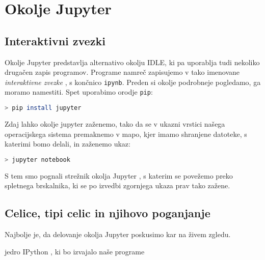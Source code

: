 \chapter{Okolje Jupyter}

\section{Interaktivni zvezki}
Okolje Jupyter predstavlja alternativo okolju IDLE, ki pa uporablja tudi nekoliko drugačen zapis programov. Programe namreč zapisujemo v tako imenovane \emph{interaktivne zvezke} , s končnico \texttt{ipynb}. Preden si okolje podrobneje pogledamo, ga moramo namestiti. Spet uporabimo orodje \texttt{pip}:
\begin{lstlisting}[language=bash]
> pip install jupyter
\end{lstlisting}
Zdaj lahko okolje jupyter zaženemo, tako da se v ukazni vrstici našega operacijskega sistema premaknemo v mapo, kjer imamo shranjene datoteke, s katerimi bomo delali, in zaženemo ukaz:
\begin{lstlisting}[language=bash]
> jupyter notebook
\end{lstlisting}
S tem smo pognali strežnik okolja Jupyter , s katerim se povežemo preko spletnega brskalnika, ki se po izvedbi zgornjega ukaza prav tako zažene. 

\section{Celice, tipi celic in njihovo poganjanje}
Najbolje je, da delovanje okolja Jupyter poskusimo kar na živem zgledu. 



jedro IPython , ki bo izvajalo naše programe
